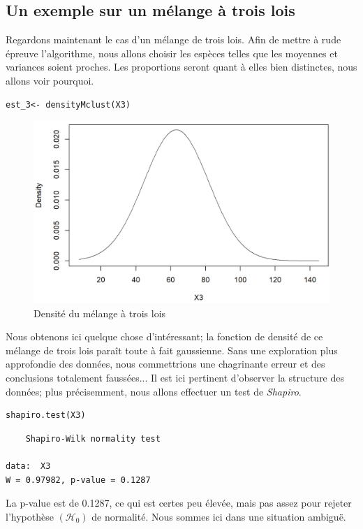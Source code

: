 \documentclass[frenchb]{report}
\newcommand{\1}{\mathbbm{1}}
\theoremstyle{definition}\newtheorem{defn}{Définition}
\theoremstyle{definition}\newtheorem{exm}{Exemple}
\theoremstyle{definition}\newtheorem{nota}{Notation}
\theoremstyle{definition}\newtheorem{rem}{Remarque}
\begin{document}
\begin{appendices}
\section{Un exemple sur un mélange à trois lois}
Regardons maintenant le cas d'un mélange de trois lois. Afin de mettre à rude épreuve l'algorithme, nous allons choisir les espèces telles que les moyennes et variances soient proches. Les proportions seront quant à elles bien distinctes, nous allons voir pourquoi.
%
\begin{lstlisting}
est_3<- densityMclust(X3)
\end{lstlisting}
\begin{figure}[H]
\centering
\includegraphics[scale=0.75]{fig2.png}
\caption{Densité du mélange à trois lois}
\end{figure}
Nous obtenons ici quelque chose d'intéressant; la fonction de densité de ce mélange de trois lois paraît toute à fait gaussienne. Sans une exploration plus approfondie des données, nous commettrions une chagrinante erreur et des conclusions totalement faussées... \newline
%
Il est ici pertinent d'observer la structure des données; plus précisemment, nous allons effectuer un test de \textit{Shapiro}.
\begin{lstlisting}
shapiro.test(X3)
\end{lstlisting}

\begin{verbatim}
	Shapiro-Wilk normality test

data:  X3
W = 0.97982, p-value = 0.1287
\end{verbatim}
La p-value est de 0.1287, ce qui est certes peu élevée, mais pas assez pour rejeter l'hypothèse $(\mathcal{H}_0)$ de normalité. Nous sommes ici dans une situation ambiguë.\newline
%


\end{appendices}
\end{document}
